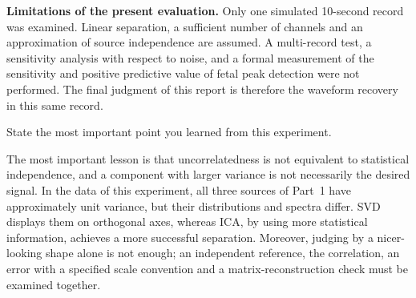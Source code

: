 \begin{notebox}
\textbf{Limitations of the present evaluation.} Only one simulated 10-second record was examined. Linear separation, a sufficient number of channels and an approximation of source independence are assumed. A multi-record test, a sensitivity analysis with respect to noise, and a formal measurement of the sensitivity and positive predictive value of fetal peak detection were not performed. The final judgment of this report is therefore the waveform recovery in this same record.
\end{notebox}


\begin{taskbox}
State the most important point you learned from this experiment.
\end{taskbox}

The most important lesson is that uncorrelatedness is not equivalent to statistical independence, and a component with larger variance is not necessarily the desired signal. In the data of this experiment, all three sources of Part~1 have approximately unit variance, but their distributions and spectra differ. SVD displays them on orthogonal axes, whereas ICA, by using more statistical information, achieves a more successful separation. Moreover, judging by a nicer-looking shape alone is not enough; an independent reference, the correlation, an error with a specified scale convention and a matrix-reconstruction check must be examined together.
